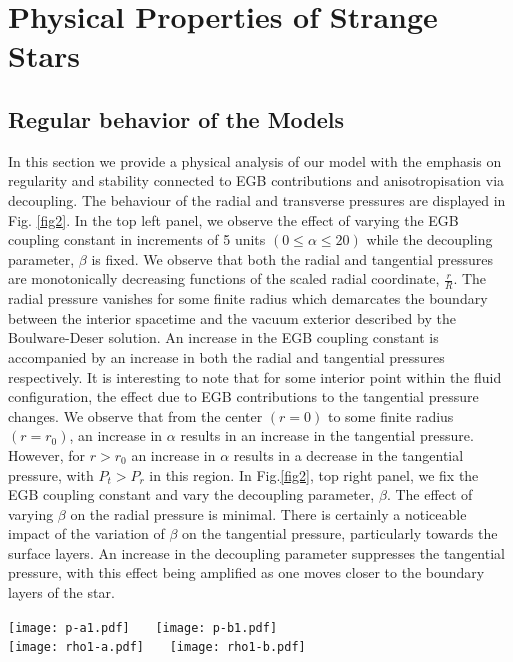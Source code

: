 \documentclass[]{aastex631}
\begin{document}
\section{Physical Properties of Strange Stars} \label{sec5}
\subsection{Regular behavior of the Models} \label{sec5.1}
In this section we provide a physical analysis of our model with the emphasis on regularity and stability  connected to EGB contributions and anisotropisation via decoupling. The behaviour of the radial and transverse pressures are displayed in Fig. \ref{fig2}.
In the top left panel, we observe the effect of varying the EGB coupling constant in increments of 5 units $(0 \leq \alpha \leq 20)$ while the decoupling parameter, $\beta$ is fixed. We observe that both the radial and tangential pressures are monotonically decreasing functions of the scaled radial coordinate, $\frac{r}{R}$. The radial pressure vanishes for some finite radius which demarcates the boundary between the interior spacetime and the vacuum exterior described by the Boulware-Deser solution. An increase in the EGB coupling constant is accompanied by an increase in both the radial and tangential pressures respectively. It is interesting to note that for some interior point within the fluid configuration, the effect due to EGB contributions to the tangential pressure changes. We observe that from the center $(r = 0)$ to some finite radius $(r = r_0)$, an increase in $\alpha$ results in an increase in the tangential pressure. However, for $r > r_0$ an increase in $\alpha$ results in a decrease in the tangential pressure, with $P_t > P_r$ in this region. In Fig.\ref{fig2}, top right panel, we fix the EGB coupling constant and vary the decoupling parameter, $\beta$. The effect of varying $\beta$ on the radial pressure is minimal. There is certainly a noticeable impact of the variation of $\beta$ on the tangential pressure, particularly towards the surface layers. An increase in the decoupling parameter suppresses the tangential pressure, with this effect being amplified as one moves closer to the boundary layers of the star. \\
\begin{figure*}
    \centering
    \texttt{[image: p-a1.pdf]}~~~ \texttt{[image: p-b1.pdf]}\\
     \texttt{[image: rho1-a.pdf]}~~~  \texttt{[image: rho1-b.pdf]}
    \caption{\textit{Top panels} and \textit{Bottom panels} show the  pressures [ radial ($P_r$) and tangential ($P_{t}$)] energy density with respect to $r/R$ for different $\alpha$ and  $\beta$, respectively for the $\theta^0_0=\hat{\epsilon}$ solution.
 We set the numerical values $~L = 0.003/km^2,~N = 10^{-7}/km^4,~
R = 11\,km$ for plotting of left panels and right panel when $\beta=0.02$ and $\alpha=2\, km^2$, respectively.}
    \label{fig2}
\end{figure*}
\end{document}
